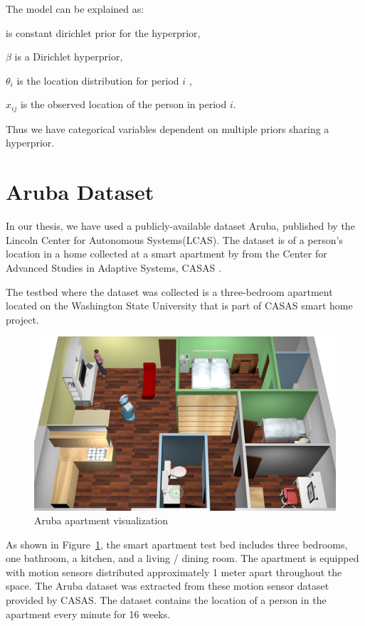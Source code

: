 The model can be explained as:

	\boldmath{$\alpha$} is  constant dirichlet prior for the hyperprior, 
	
	$\beta$ is a Dirichlet hyperprior,
	
	$\theta_i$ is the location distribution for period $i$  ,
	
	$x_{ij}$ is the observed location of the person in period $i$.
	
Thus we have categorical variables dependent on multiple priors sharing a hyperprior.


\section{Aruba Dataset}
In our thesis, we have used a  publicly-available  dataset Aruba, published by the Lincoln Center for Autonomous Systems(LCAS). The dataset is of a person's location in a home collected at a smart apartment by \cite{aruba} from the Center for Advanced Studies in Adaptive Systems, CASAS .

The testbed where the dataset was collected is a  three-bedroom apartment located on the Washington State University that is part of CASAS smart home project. 
\begin{figure}[htp]
\centering
\includegraphics[width=\textwidth]{images/aruba-flat.png}
\caption{Aruba apartment visualization}
\label{aruba}
\end{figure}
As shown in Figure~\ref{aruba}, the smart apartment test bed includes three bedrooms, one bathroom, a kitchen, and a living / dining room.  The apartment is equipped with motion sensors distributed approximately 1 meter apart throughout the space. The Aruba dataset was extracted from these motion sensor dataset provided by CASAS. The dataset contains the location of a person in the apartment every minute for 16 weeks.


